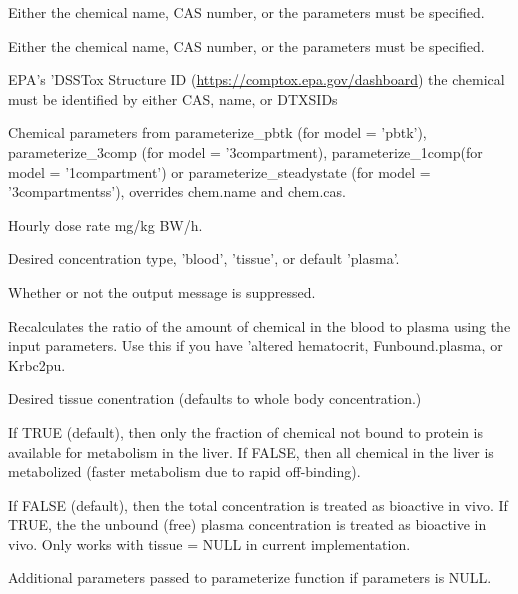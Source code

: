\documentclass[a4paper]{book}
\begin{document}
\begin{Arguments}
\begin{ldescription}
\item[\code{chem.name}] Either the chemical name, CAS number, or the parameters must 
be specified.

\item[\code{chem.cas}] Either the chemical name, CAS number, or the parameters must 
be specified.

\item[\code{dtxsid}] EPA's 'DSSTox Structure ID (\url{https://comptox.epa.gov/dashboard})
the chemical must be identified by either CAS, name, or DTXSIDs

\item[\code{parameters}] Chemical parameters from parameterize\_pbtk (for model = 
'pbtk'), parameterize\_3comp (for model = '3compartment), 
parameterize\_1comp(for model = '1compartment') or parameterize\_steadystate 
(for model = '3compartmentss'), overrides chem.name and chem.cas.

\item[\code{hourly.dose}] Hourly dose rate mg/kg BW/h.

\item[\code{concentration}] Desired concentration type, 'blood', 'tissue', or default 'plasma'.

\item[\code{suppress.messages}] Whether or not the output message is suppressed.

\item[\code{recalc.blood2plasma}] Recalculates the ratio of the amount of chemical 
in the blood to plasma using the input parameters. Use this if you have 
'altered hematocrit, Funbound.plasma, or Krbc2pu.

\item[\code{tissue}] Desired tissue conentration (defaults to whole body 
concentration.)

\item[\code{restrictive.clearance}] If TRUE (default), then only the fraction of
chemical not bound to protein is available for metabolism in the liver. If 
FALSE, then all chemical in the liver is metabolized (faster metabolism due
to rapid off-binding).

\item[\code{bioactive.free.invivo}] If FALSE (default), then the total concentration is treated
as bioactive in vivo. If TRUE, the the unbound (free) plasma concentration is treated as 
bioactive in vivo. Only works with tissue = NULL in current implementation.

\item[\code{...}] Additional parameters passed to parameterize function if 
parameters is NULL.
\end{ldescription}
\end{Arguments}
\end{document}

